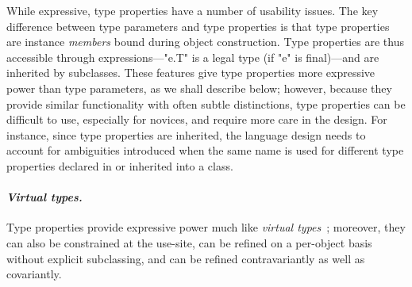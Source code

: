 While expressive,
type properties have a number of usability issues.
The key difference between type parameters and type properties
is that type properties are
instance \emph{members} bound during object construction.  Type
properties are thus accessible through expressions---\xcd"e.T" is
a legal type (if \xcd"e" is final)---and are inherited by subclasses.
These features give type properties more expressive power than
type parameters, as we shall describe below; however, because they 
provide similar functionality with often subtle distinctions,
type properties can be difficult to use, especially for novices,
and require more care in the design.
For instance,
since type properties are inherited,
the language design needs
to account for ambiguities introduced when the same name is
used for different type properties declared in or inherited into a class.


\paragraph{\normalfont\bf\em Virtual types.}

Type properties provide expressive power much like 
\emph{virtual
types}~\cite{beta,mp89-virtual-classes,ernst06-virtual};
moreover, they can also
be constrained at the use-site,
can be refined on a per-object basis without explicit subclassing,
and can be refined contravariantly as well as covariantly.

